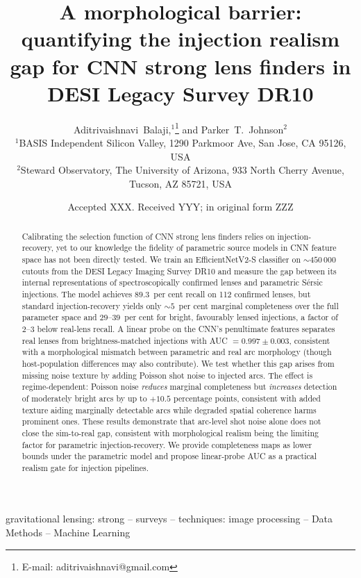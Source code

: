 \documentclass[fleqn,usenatbib]{rasti}
\title[Injection realism gap for CNN lens finding]{A morphological barrier: quantifying the injection realism gap for CNN strong lens finders in DESI Legacy Survey DR10}
\author[Balaji \& Johnson]{
Aditrivaishnavi~Balaji,$^{1}$\thanks{E-mail: aditrivaishnavi@gmail.com}
and Parker~T.~Johnson$^{2}$
\\
$^{1}$BASIS Independent Silicon Valley, 1290 Parkmoor Ave, San Jose, CA 95126, USA\\
$^{2}$Steward Observatory, The University of Arizona, 933 North Cherry Avenue, Tucson, AZ 85721, USA
}
\date{Accepted XXX. Received YYY; in original form ZZZ}
\begin{document}
\label{firstpage}
\pagerange{\pageref{firstpage}--\pageref{lastpage}}
\maketitle

\begin{abstract}
Calibrating the selection function of CNN strong lens finders relies on injection-recovery, yet to our knowledge the fidelity of parametric source models in CNN feature space has not been directly tested.  We train an EfficientNetV2-S classifier on $\sim\!450\,000$ cutouts from the DESI Legacy Imaging Survey DR10 and measure the gap between its internal representations of spectroscopically confirmed lenses and parametric S\'{e}rsic injections.  The model achieves $89.3$~per cent recall on 112 confirmed lenses, but standard injection-recovery yields only $\sim\!5$~per cent marginal completeness over the full parameter space and $29$--$39$~per cent for bright, favourably lensed injections, a factor of $2$--$3$ below real-lens recall.  A linear probe on the CNN's penultimate features separates real lenses from brightness-matched injections with AUC $= 0.997 \pm 0.003$, consistent with a morphological mismatch between parametric and real arc morphology (though host-population differences may also contribute).  We test whether this gap arises from missing noise texture by adding Poisson shot noise to injected arcs.  The effect is regime-dependent: Poisson noise \emph{reduces} marginal completeness but \emph{increases} detection of moderately bright arcs by up to $+10.5$ percentage points, consistent with added texture aiding marginally detectable arcs while degraded spatial coherence harms prominent ones.  These results demonstrate that arc-level shot noise alone does not close the sim-to-real gap, consistent with morphological realism being the limiting factor for parametric injection-recovery.  We provide completeness maps as lower bounds under the parametric model and propose linear-probe AUC as a practical realism gate for injection pipelines.
\end{abstract}

\begin{keywords}
gravitational lensing: strong -- surveys -- techniques: image processing -- Data Methods -- Machine Learning
\end{keywords}
\end{document}
